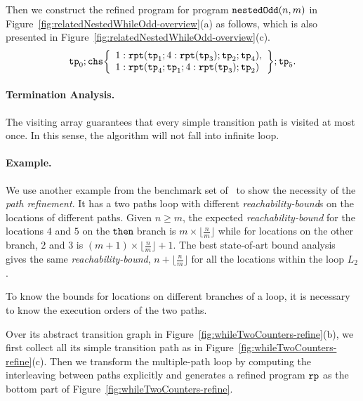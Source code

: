 Then we construct the refined program for program $\mathtt{nestedOdd}(n, m)$ in Figure~\ref{fig:relatedNestedWhileOdd-overview}(a) as follows, which is also presented in Figure~\ref{fig:relatedNestedWhileOdd-overview}(c).
\[
 \tpath_0 ; \rpchoose{ 
 \begin{array}{l}
    1: \rprepeat(\tpath_1; 4:\rprepeat(\tpath_3); \tpath_2; \tpath_4), \\
    1: \rprepeat(\tpath_4; \tpath_1; 4:\rprepeat(\tpath_3); \tpath_2) 
 \end{array}
 }; \tpath_5.
\]


\paragraph{Termination Analysis.}
The visiting array guarantees that every simple transition path is visited at most once.
In this sense, the algorithm will not fall into infinite loop.


\paragraph{Example.}
We use another example from the benchmark set of~\cite{GulwaniJK09} to show the necessity of the \emph{path refinement}. 
It has a two paths loop
with different \emph{reachability-bound}s on the locations of different paths.
%
Given $n \geq m$,
the expected \emph{reachability-bound} for the locations $4$ and $5$ on the$\mathtt{\;then\;}$branch is $m \times \lfloor\frac{n}{m}\rfloor$
while for locations on the other branch, $2$ and $3$ is $(m + 1) \times \lfloor\frac{n}{m}\rfloor + 1$. 
The best state-of-art bound analysis
gives the same \emph{reachability-bound}, $n + \lfloor\frac{n}{m}\rfloor$ for all the locations within the loop $L_2$.

To know the bounds for locations on different branches of a loop, 
it is necessary to know the execution orders of the two paths.

Over its abstract transition graph in Figure~\ref{fig:whileTwoCounters-refine}(b), we first collect all its simple transition path as in Figure~\ref{fig:whileTwoCounters-refine}(c).
Then we transform the multiple-path loop by computing the interleaving between paths explicitly and
generates a refined program $\mathtt{rp}$ as the bottom part of Figure~\ref{fig:whileTwoCounters-refine}.

